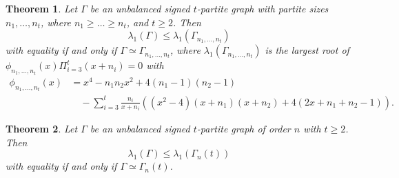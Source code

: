 \documentclass[12pt]{article}
\numberwithin{equation}{section}
\newtheorem {Theorem} {Theorem}[section]
\newtheorem {Corollary}{Corollary}[section]
\begin{document}



\begin{Theorem}\label{N1}
Let $\Gamma$ be an unbalanced signed $t$-partite graph with partite sizes $n_1, \dots, n_t$, where $n_1\ge \dots\ge n_t$, and $t\ge 2$. Then
\[
\lambda_1(\Gamma)\le \lambda_1\left(\Gamma_{n_1, \dots, n_t}\right)
\]
with equality if and only if $\Gamma\simeq \Gamma_{n_1, \dots, n_t}$, where 
$\lambda_1\left(\Gamma_{n_1, \dots, n_t}\right)$ is the largest root of $\phi_{n_1,\dots, n_t}(x)\Pi_{i=3}^t(x+n_i)=0$ with 
\begin{align*}
\phi_{n_1,\dots, n_t}(x)&=
x^4-n_1n_2x^2+4(n_1-1)(n_2-1)\\
&\quad -\sum_{i=3}^{t}\frac{n_i}{x+n_i}\left((x^2-4)(x+n_1)(x+n_2)+4(2x+n_1+n_2-1)\right).
\end{align*}
\end{Theorem}






\begin{Theorem}\label{N2}
Let $\Gamma$ be an unbalanced signed $t$-partite graph of order $n$ with $t\ge 2$. Then
\[
\lambda_1(\Gamma)\le \lambda_1\left(\Gamma_n(t)\right)
\]
with equality if and only if $\Gamma\simeq \Gamma_n(t)$.
\end{Theorem}




%
%

%
%
%
\end{document}
